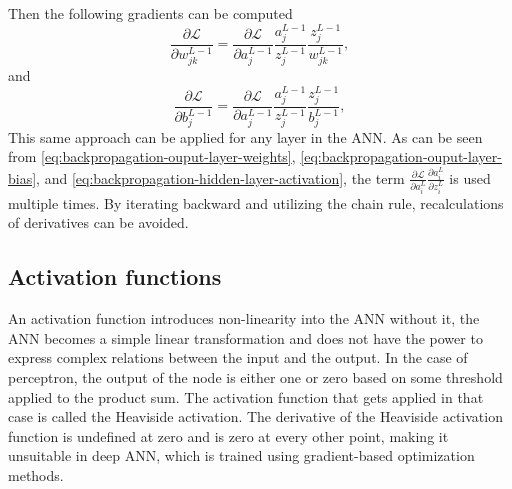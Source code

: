 Then the following gradients can be computed
\begin{equation*}
    \frac{\partial \mathcal{L}}{\partial w_{jk}^{L-1}} = \frac{\partial \mathcal{L}}{\partial a_j^{L-1}} \frac{a_j^{L-1}}{z_j^{L-1}} \frac{z_j^{L-1}}{w_{jk}^{L-1}},
\end{equation*}
and
\begin{equation*}
    \frac{\partial \mathcal{L}}{\partial b_j^{L-1}} = \frac{\partial \mathcal{L}}{\partial a_j^{L-1}} \frac{a_j^{L-1}}{z_j^{L-1}} \frac{z_j^{L-1}}{b_j^{L-1}},
\end{equation*}
This same approach can be applied for any layer in the \gls{ANN}.
As can be seen from \autoref{eq:backpropagation-ouput-layer-weights}, \autoref{eq:backpropagation-ouput-layer-bias}, and \autoref{eq:backpropagation-hidden-layer-activation}, the term $\frac{\partial\mathcal{L}}{\partial a_i^L} \frac{\partial a_i^L}{\partial z_i^L}$ is used multiple times.
By iterating backward and utilizing the chain rule, recalculations of derivatives can be avoided.

\subsection{Activation functions}

An activation function introduces non-linearity into the \gls{ANN} without it, the \gls{ANN} becomes a simple linear transformation and does not have the power to express complex relations between the input and the output.
In the case of perceptron, the output of the node is either one or zero based on some threshold applied to the product sum.
The activation function that gets applied in that case is called the Heaviside activation.
The derivative of the Heaviside activation function is undefined at zero and is zero at every other point, making it unsuitable in deep \gls{ANN}, which is trained using gradient-based optimization methods.

